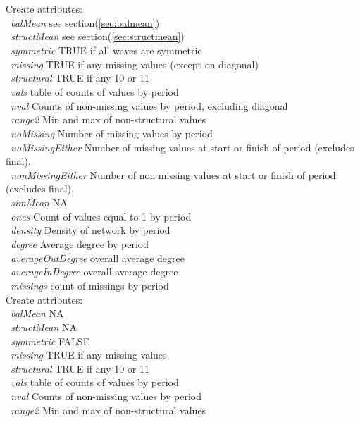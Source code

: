 \documentclass[12pt,a4paper]{article}
\renewcommand{\=}{\,=\,}
\newcommand{\+}{\,+\,}
\newcommand{\nnm}[1]{\textsf{\textit{#1}}}
\newcommand{\sfn}[1]{\textbf{\texttt{#1}}}
\begin{document}
\begin{algorithmic}
\STATE Create attributes:\\
\sfn{ }\nnm{balMean} see section(\ref{sec:balmean})\\
\sfn{ }\nnm{structMean} see section(\ref{sec:structmean})\\
\sfn{ }\nnm{symmetric} TRUE if all waves are symmetric\\
\sfn{ }\nnm{missing} TRUE if any missing values (except on diagonal)\\
\sfn{ }\nnm{structural} TRUE if any 10 or 11\\
\sfn{ }\nnm{vals} table of counts of values by period\\
\sfn{ }\nnm{nval} Counts of non-missing values by period, excluding diagonal\\
\sfn{ }\nnm{range2} Min and max of non-structural values\\
\sfn{ }\nnm{noMissing} Number of missing values by period\\
\sfn{ }\nnm{noMissingEither} Number of missing values at start or finish of
period (excludes final).\\
\sfn{ }\nnm{nonMissingEither} Number of non missing values at start or finish of
period (excludes final).\\
\sfn{ }\nnm{simMean} NA\\
\sfn{ }\nnm{ones} Count of values equal to 1 by period\\
\sfn{ }\nnm{density} Density of network by period\\
\sfn{ }\nnm{degree} Average degree by period\\
\sfn{ }\nnm{averageOutDegree} overall average degree\\
\sfn{ }\nnm{averageInDegree} overall average degree\\
\sfn{ }\nnm{missings} count of missings by period\\
\STATE Create attributes:\\
\sfn{ }\nnm{balMean} NA\\
\sfn{ }\nnm{structMean} NA\\
\sfn{ }\nnm{symmetric} FALSE\\
\sfn{ }\nnm{missing} TRUE if any missing values\\
\sfn{ }\nnm{structural} TRUE if any 10 or 11\\
\sfn{ }\nnm{vals} table of counts of values by period\\
\sfn{ }\nnm{nval} Counts of non-missing values by period\\
\sfn{ }\nnm{range2} Min and max of non-structural values\\

\end{algorithmic}
\end{document}
